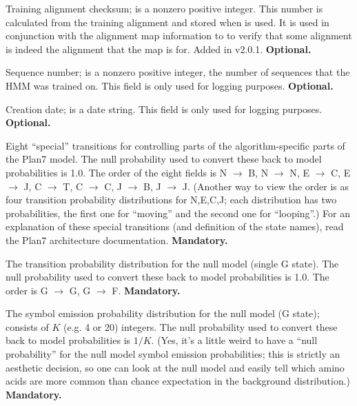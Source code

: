 \begin{wideitem}
\item [\emprog{CKSUM  <d>}] Training alignment checksum;  is a nonzero
positive integer. This number is calculated from the training
alignment and stored when  is used. It is used in
conjunction with the alignment map information to to verify that some
alignment is indeed the alignment that the map is for.  Added in
v2.0.1. \textbf{Optional.}

\item [\emprog{NSEQ  <d>}] Sequence number;  is a nonzero
positive integer, the number of sequences that the HMM was trained on.
This field is only used for logging purposes.
\textbf{Optional.}

\item [\emprog{DATE  <s>}] Creation date;  is a date string.
This field is only used for logging purposes.
\textbf{Optional.}

\item [\emprog{XT    <d>*8}] Eight ``special'' transitions for
controlling parts of the algorithm-specific parts of the Plan7 model.
The null probability used to convert these back to model probabilities
is 1.0. The order of the eight fields is N $\rightarrow$ B, N
$\rightarrow$ N, E $\rightarrow$ C, E $\rightarrow$ J, C $\rightarrow$
T, C $\rightarrow$ C, J $\rightarrow$ B, J $\rightarrow$ J.  (Another
way to view the order is as four transition probability distributions
for N,E,C,J; each distribution has two probabilities, the first one
for ``moving'' and the second one for ``looping''.) For an explanation
of these special transitions (and definition of the state names), read
the Plan7 architecture documentation.
\textbf{Mandatory.}

\item [\emprog{NULT  <d> <d>}] The transition probability distribution
for the null model (single G state). The null probability used to
convert these back to model probabilities is 1.0. The order is G
$\rightarrow$ G, G $\rightarrow$ F.
\textbf{Mandatory.}

\item [\emprog{NULE  <d>*K}] The symbol emission probability
distribution for the null model (G state); consists of $K$ (e.g. 4 or
20) integers. The null probability used to convert these back to model
probabilities is $1/K$. (Yes, it's a little weird to have a ``null
probability'' for the null model symbol emission probabilities; this
is strictly an aesthetic decision, so one can look at the null model
and easily tell which amino acids are more common than chance
expectation in the background distribution.) 
\textbf{Mandatory.}


\end{wideitem}
